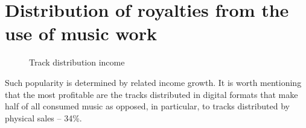 \documentclass[12pt]{report}
\begin{document}
\section{Distribution of royalties from the use of music work}
\label{industry-distribution}

\newcommand{\slice}[4]{
  \pgfmathparse{0.5*#1+0.5*#2}
  \let\midangle\pgfmathresult

  \draw[thick,fill=black!10] (0,0) -- (#1:1) arc (#1:#2:1) -- cycle;

  \node[label=\midangle:#4] at (\midangle:1) {};

  \pgfmathparse{min((#2-#1-10)/110*(-0.3),0)}
  \let\temp\pgfmathresult
  \pgfmathparse{max(\temp,-0.5) + 0.8}
  \let\innerpos\pgfmathresult
  \node at (\midangle:\innerpos) {#3};
}

\def\Royalty{Copyright}
\def\Digital{Digital formats}
\def\Physical{Physical media}
\def\Sync{Synchronization}

\begin{figure}[H]
\centering
\caption{Track distribution income}
\end{figure}

Such popularity is determined by related income growth. It is worth mentioning that the most profitable are the tracks distributed in digital formats that make half of all consumed music as opposed, in particular, to tracks distributed by physical sales – 34\%.
\end{document}
